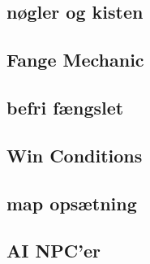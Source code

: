 \newpage
\subsection{nøgler og kisten}


\newpage
\subsection{Fange Mechanic}


\newpage
\subsection{befri fængslet}


\newpage
\subsection{Win Conditions}


\newpage
\subsection{map opsætning}


\newpage
\subsection{AI NPC'er}
